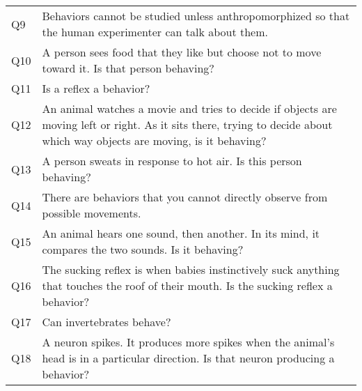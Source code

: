 \begin{tabular}{ll}
Q9                    &                                                                                                   Behaviors cannot be studied unless anthropomorphized so that the human experimenter can talk about them. \\
Q10                   &                                                                                                               A person sees food that they like but choose not to move toward it. Is that person behaving? \\
Q11                   &                                                                                                                                                                                    Is a reflex a behavior? \\
Q12                   &                                  An animal watches a movie and tries to decide if objects are moving left or right. As it sits there, trying to decide about which way objects are moving, is it behaving? \\
Q13                   &                                                                                                                                           A person sweats in response to hot air. Is this person behaving? \\
Q14                   &                                                                                                                              There are behaviors that you cannot directly observe from possible movements. \\
Q15                   &                                                                                                          An animal hears one sound, then another. In its mind, it compares the two sounds. Is it behaving? \\
Q16                   &                                                                      The sucking reflex is when babies instinctively suck anything that touches the roof of their mouth. Is the sucking reflex a behavior? \\
Q17                   &                                                                                                                                                                                  Can invertebrates behave? \\
Q18                   &                                                                         A neuron spikes. It produces more spikes when the animal’s head is in a particular direction. Is that neuron producing a behavior? \\

\end{tabular}
